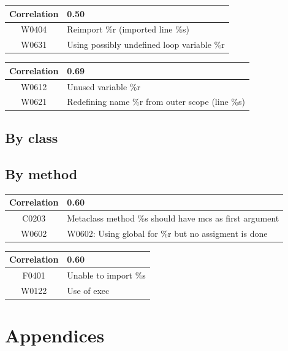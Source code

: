 \documentclass[12pt, a4paper]{article}
\newcommand{\tbf}[1]{\textbf{#1}}
\newcommand{\noi}{\noindent}
\begin{document}
\bigskip \noi
\begin{tabularx}{\textwidth}{|c|X|}
\hline
\tbf{Correlation}		& 0.50 \\
\hline
W0404		& Reimport \%r (imported line \%s) \\
\hline
W0631		& Using possibly undefined loop variable \%r \\
\hline
\end{tabularx}


\bigskip \noi
\begin{tabularx}{\textwidth}{|c|X|}
\hline
\tbf{Correlation}		& 0.69 \\
\hline
W0612		& Unused variable \%r \\
\hline
W0621		& Redefining name \%r from outer scope (line \%s) \\
\hline
\end{tabularx}



\subsection{By class}


\subsection{By method}

\bigskip \noi
\begin{tabularx}{\textwidth}{|c|X|}
\hline
\tbf{Correlation}   & 0.60 \\
\hline
C0203   &  Metaclass method \%s should have mcs as first argument \\
\hline
W0602   &  W0602: Using global for \%r but no assigment is done \\
\hline
\end{tabularx}


\bigskip \noi
\begin{tabularx}{\textwidth}{|c|X|}
\hline
\tbf{Correlation}   & 0.60 \\
\hline
F0401   &  Unable to import \%s \\
\hline
W0122   &  Use of exec \\
\hline
\end{tabularx}


\newpage
\section*{Appendices}

\renewcommand{\textfraction}{0.01}
\renewcommand{\topfraction}{0.01}
\renewcommand{\bottomfraction}{0.01}
\renewcommand{\floatpagefraction}{0.01}
\setcounter{totalnumber}{1}
\end{document}
